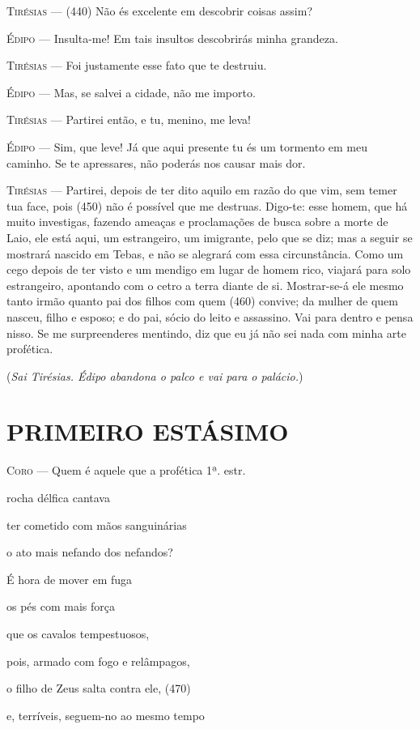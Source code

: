 \textsc{Tirésias} --- (440) Não és excelente em descobrir coisas assim?

\textsc{Édipo} --- Insulta-me! Em tais insultos descobrirás minha grandeza.

\textsc{Tirésias} --- Foi justamente esse fato que te destruiu.

\textsc{Édipo} --- Mas, se salvei a cidade, não me importo.

\textsc{Tirésias} --- Partirei então, e tu, menino, me leva!

\textsc{Édipo} --- Sim, que leve! Já que aqui presente tu és um tormento em meu caminho. Se
te apressares, não poderás nos causar mais dor.

\textsc{Tirésias} --- Partirei, depois de ter dito aquilo em razão do que vim, sem temer tua
face, pois (450) não é possível que me destruas. Digo-te: esse homem,
que há muito investigas, fazendo ameaças e proclamações de busca sobre a
morte de Laio, ele está aqui, um estrangeiro, um imigrante, pelo que se
diz; mas a seguir se mostrará nascido em Tebas, e não se alegrará com
essa circunstância. Como um cego depois de ter visto e um mendigo em
lugar de homem rico, viajará para solo estrangeiro, apontando com o
cetro a terra diante de si. Mostrar-se-á ele mesmo tanto irmão quanto
pai dos filhos com quem (460) convive; da mulher de quem nasceu, filho e
esposo; e do pai, sócio do leito e assassino. Vai para dentro e pensa
nisso. Se me surpreenderes mentindo, diz que eu já não sei nada com
minha arte profética.

(\emph{Sai Tirésias. Édipo abandona o palco e vai para o palácio.})

\section{PRIMEIRO ESTÁSIMO}

\textsc{Coro} --- Quem é aquele que a profética 1ª. estr.

rocha délfica cantava

ter cometido com mãos sanguinárias

o ato mais nefando dos nefandos?

É hora de mover em fuga

os pés com mais força

que os cavalos tempestuosos,

pois, armado com fogo e relâmpagos,

o filho de Zeus salta contra ele, (470)

e, terríveis, seguem-no ao mesmo tempo

